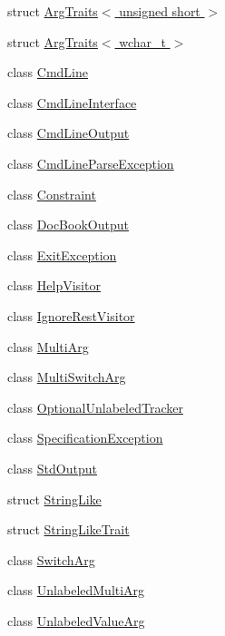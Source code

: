 \begin{DoxyCompactItemize}
struct \hyperlink{struct_t_c_l_a_p_1_1_arg_traits_3_01unsigned_01short_01_4}{Arg\+Traits$<$ unsigned short $>$}
\item 
struct \hyperlink{struct_t_c_l_a_p_1_1_arg_traits_3_01wchar__t_01_4}{Arg\+Traits$<$ wchar\+\_\+t $>$}
\item 
class \hyperlink{class_t_c_l_a_p_1_1_cmd_line}{Cmd\+Line}
\item 
class \hyperlink{class_t_c_l_a_p_1_1_cmd_line_interface}{Cmd\+Line\+Interface}
\item 
class \hyperlink{class_t_c_l_a_p_1_1_cmd_line_output}{Cmd\+Line\+Output}
\item 
class \hyperlink{class_t_c_l_a_p_1_1_cmd_line_parse_exception}{Cmd\+Line\+Parse\+Exception}
\item 
class \hyperlink{class_t_c_l_a_p_1_1_constraint}{Constraint}
\item 
class \hyperlink{class_t_c_l_a_p_1_1_doc_book_output}{Doc\+Book\+Output}
\item 
class \hyperlink{class_t_c_l_a_p_1_1_exit_exception}{Exit\+Exception}
\item 
class \hyperlink{class_t_c_l_a_p_1_1_help_visitor}{Help\+Visitor}
\item 
class \hyperlink{class_t_c_l_a_p_1_1_ignore_rest_visitor}{Ignore\+Rest\+Visitor}
\item 
class \hyperlink{class_t_c_l_a_p_1_1_multi_arg}{Multi\+Arg}
\item 
class \hyperlink{class_t_c_l_a_p_1_1_multi_switch_arg}{Multi\+Switch\+Arg}
\item 
class \hyperlink{class_t_c_l_a_p_1_1_optional_unlabeled_tracker}{Optional\+Unlabeled\+Tracker}
\item 
class \hyperlink{class_t_c_l_a_p_1_1_specification_exception}{Specification\+Exception}
\item 
class \hyperlink{class_t_c_l_a_p_1_1_std_output}{Std\+Output}
\item 
struct \hyperlink{struct_t_c_l_a_p_1_1_string_like}{String\+Like}
\item 
struct \hyperlink{struct_t_c_l_a_p_1_1_string_like_trait}{String\+Like\+Trait}
\item 
class \hyperlink{class_t_c_l_a_p_1_1_switch_arg}{Switch\+Arg}
\item 
class \hyperlink{class_t_c_l_a_p_1_1_unlabeled_multi_arg}{Unlabeled\+Multi\+Arg}
\item 
class \hyperlink{class_t_c_l_a_p_1_1_unlabeled_value_arg}{Unlabeled\+Value\+Arg}
\item 

\end{DoxyCompactItemize}

